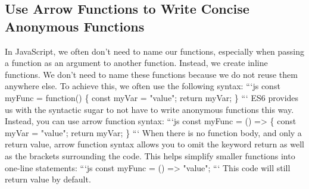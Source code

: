 \documentclass{article}%
\begin{document}
\subsection{Use Arrow Functions to Write Concise Anonymous Functions}%
\label{subsec:UseArrowFunctionstoWriteConciseAnonymousFunctions}%
In JavaScript, we often don't need to name our functions, especially when passing a function as an argument to another function. Instead, we create inline functions. We don't need to name these functions because we do not reuse them anywhere else.\newline%
To achieve this, we often use the following syntax:\newline%
```js\newline%
const myFunc = function() \{\newline%
  const myVar = "value";\newline%
  return myVar;\newline%
\}\newline%
```\newline%
ES6 provides us with the syntactic sugar to not have to write anonymous functions this way. Instead, you can use arrow function syntax:\newline%
```js\newline%
const myFunc = () => \{\newline%
  const myVar = "value";\newline%
  return myVar;\newline%
\}\newline%
```\newline%
When there is no function body, and only a return value, arrow function syntax allows you to omit the keyword return as well as the brackets surrounding the code. This helps simplify smaller functions into one{-}line statements:\newline%
```js\newline%
const myFunc = () => "value";\newline%
```\newline%
This code will still return value by default.\newline%

%
\end{document}
